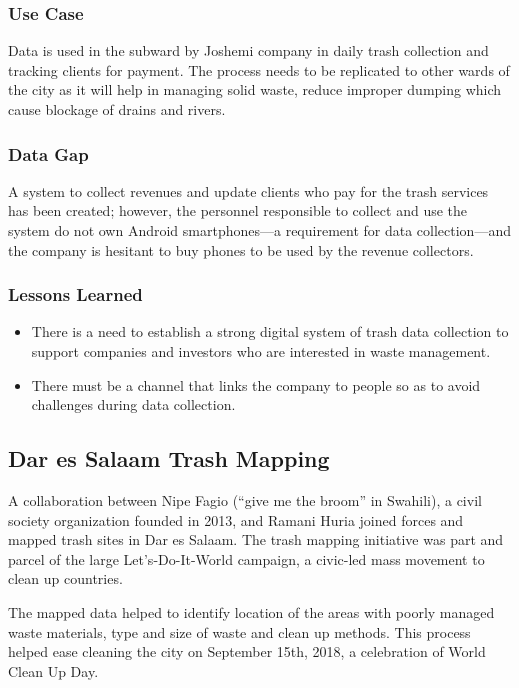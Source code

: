 \documentclass[a4paper,12pt,twoside]{article}
\begin{document}
\subsubsection{Use Case}
Data is used in the subward by Joshemi company in daily trash collection and tracking clients for payment. The process needs to be replicated to other wards of the city as it will help in managing solid waste, reduce improper dumping which cause blockage of drains and rivers. 

\subsubsection{Data Gap}
A system to collect revenues and update clients who pay for the trash services has been created; however, the personnel responsible to collect and use the system do not own Android smartphones---a requirement for data collection---and the company is hesitant to buy phones to be used by the revenue collectors.

\subsubsection{Lessons Learned}
\begin{itemize}
    \item There is a need to establish  a strong digital system of trash data collection to support companies and investors who are interested in waste management.
    \item There must be a channel that links the company to people so as to avoid challenges during data collection.
\end{itemize}

\newpage
\subsection{Dar es Salaam Trash Mapping}
A collaboration between Nipe Fagio (“give me the broom” in Swahili), a civil society organization founded in 2013, and Ramani Huria joined forces and mapped trash sites in Dar es Salaam. The trash mapping initiative was part and parcel of the large Let’s-Do-It-World campaign, a civic-led mass movement to clean up countries.

The mapped data helped to identify location of the areas with poorly managed waste materials, type and size of waste and clean up methods. This process helped ease cleaning the city on September 15th, 2018, a celebration of World Clean Up Day.
\end{document}
